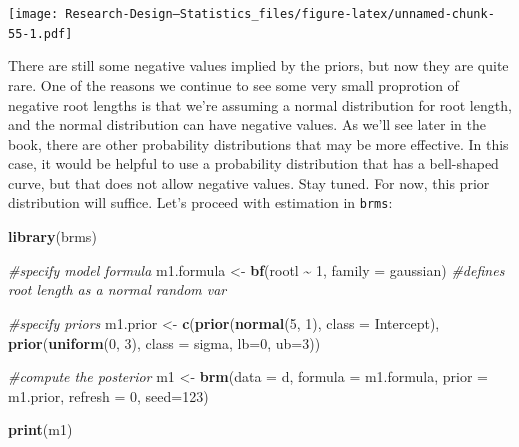 \documentclass[
]{book}
\newenvironment{Shaded}{\begin{snugshade}}{\end{snugshade}}
\newcommand{\AttributeTok}[1]{\textcolor[rgb]{0.13,0.29,0.53}{#1}}
\newcommand{\CommentTok}[1]{\textcolor[rgb]{0.56,0.35,0.01}{\textit{#1}}}
\newcommand{\DecValTok}[1]{\textcolor[rgb]{0.00,0.00,0.81}{#1}}
\newcommand{\FunctionTok}[1]{\textcolor[rgb]{0.13,0.29,0.53}{\textbf{#1}}}
\newcommand{\NormalTok}[1]{#1}
\newcommand{\OtherTok}[1]{\textcolor[rgb]{0.56,0.35,0.01}{#1}}
\newcommand{\SpecialCharTok}[1]{\textcolor[rgb]{0.81,0.36,0.00}{\textbf{#1}}}
\begin{document}
\texttt{[image: Research-Design---Statistics\_files/figure-latex/unnamed-chunk-55-1.pdf]}

There are still some negative values implied by the priors, but now they are quite rare. One of the reasons we continue to see some very small proprotion of negative root lengths is that we're assuming a normal distribution for root length, and the normal distribution can have negative values. As we'll see later in the book, there are other probability distributions that may be more effective. In this case, it would be helpful to use a probability distribution that has a bell-shaped curve, but that does not allow negative values. Stay tuned. For now, this prior distribution will suffice. Let's proceed with estimation in \texttt{brms}:

\begin{Shaded}
\begin{Highlighting}[]
\FunctionTok{library}\NormalTok{(brms)}

\CommentTok{\#specify model formula}
\NormalTok{m1.formula }\OtherTok{\textless{}{-}} \FunctionTok{bf}\NormalTok{(rootl }\SpecialCharTok{\textasciitilde{}} \DecValTok{1}\NormalTok{,}
                \AttributeTok{family =}\NormalTok{ gaussian) }\CommentTok{\#defines root length as a normal random var}

\CommentTok{\#specify priors}
\NormalTok{m1.prior }\OtherTok{\textless{}{-}} \FunctionTok{c}\NormalTok{(}\FunctionTok{prior}\NormalTok{(}\FunctionTok{normal}\NormalTok{(}\DecValTok{5}\NormalTok{, }\DecValTok{1}\NormalTok{), }\AttributeTok{class =}\NormalTok{ Intercept),}
             \FunctionTok{prior}\NormalTok{(}\FunctionTok{uniform}\NormalTok{(}\DecValTok{0}\NormalTok{, }\DecValTok{3}\NormalTok{), }\AttributeTok{class =}\NormalTok{ sigma, }\AttributeTok{lb=}\DecValTok{0}\NormalTok{, }\AttributeTok{ub=}\DecValTok{3}\NormalTok{))}
              
\CommentTok{\#compute the posterior}
\NormalTok{m1 }\OtherTok{\textless{}{-}} \FunctionTok{brm}\NormalTok{(}\AttributeTok{data =}\NormalTok{ d,}
         \AttributeTok{formula =}\NormalTok{ m1.formula,}
         \AttributeTok{prior =}\NormalTok{ m1.prior,}
         \AttributeTok{refresh =} \DecValTok{0}\NormalTok{,}
         \AttributeTok{seed=}\DecValTok{123}\NormalTok{)}

\FunctionTok{print}\NormalTok{(m1)}
\end{Highlighting}
\end{Shaded}
\end{document}
